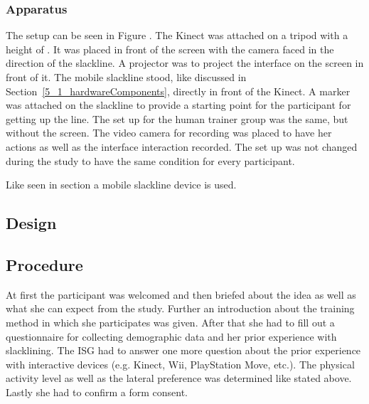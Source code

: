 \subsubsection{Apparatus}
The setup can be seen in Figure \todo{[figure]}. The Kinect was attached on a tripod with a height of \todo{90 cm}. It was placed in front of the screen with the camera faced in the direction of the slackline. A projector was  to project the interface on the screen in front of it. The mobile slackline stood, like discussed in Section~\ref{5_1_hardwareComponents}, directly in front of the Kinect. A marker was attached on the slackline to provide a starting point for the participant for getting up the line.
The set up for the human trainer group was the same, but without the screen. The video camera for recording was placed  to have her actions as well as the interface interaction recorded. The set up was not changed during the study to have the same condition for every participant.

Like seen in section  a mobile slackline device is used.

\todo{[Figure]}

\subsection{Design}

\subsection{Procedure}
At first the participant was welcomed and then briefed about the idea as well as what she can expect from the study. Further an introduction about the training method in which she participates was given. After that she had to fill out a questionnaire for collecting demographic data and her prior experience with slacklining. The ISG had to answer one more question about the prior experience with interactive devices (e.g. Kinect, Wii, PlayStation Move, etc.).
The physical activity level as well as the lateral preference was determined like stated above. Lastly she had to confirm a form consent.

